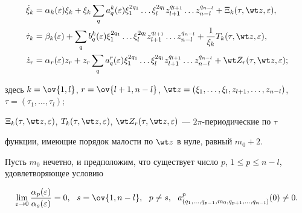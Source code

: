 \begin{align} 


\Dot\xi_k&=\alpha_k(\varepsilon)\xi_k+\xi_k\sum_q 


a^k_q(\varepsilon)\xi^{2q_1}_1\dotsc \xi^{2q_l}_l 


z^{q_{l+1}}_{l+1}\dotsc z^{q_{n-l}}_{n-l}+\Xi_k 


(\tau,\wt z,\varepsilon), \\ 


% 


\Dot\tau_k&=\beta_k(\varepsilon)+\sum_q b^k_q(\varepsilon) 


\xi^{2q_1}_1\dotsc \xi^{2q_l}_l z^{q_{l+1}}_{l+1}\dotsc 


z^{q_{n-l}}_{n-l}+\frac{1}{\xi_k}T_k 


(\tau,\wt z,\varepsilon), \\ 


% 


\Dot z_r&=\alpha_r(\varepsilon)z_r+z_r\sum_q a^r_q(\varepsilon) 


\xi^{2q_1}_1\dotsc \xi^{2q_l}_l z^{q_{l+1}}_{l+1}\dotsc 


z^{q_{n-l}}_{n-l}+\wt Z_r(\tau,\wt z,\varepsilon); 


\end{align} 


здесь $k=\ov{1,l}$, $r=\ov{l+1,n-l}$, $\wt z=(\xi_1,\dotsc,\xi_l, 


z_{l+1},\dotsc,z_{n-l})$, $\tau=(\tau_1,\dotsc,\tau_l)$; 


$\Xi_k(\tau,\wt z,\varepsilon)$, $T_k(\tau,\wt z,\varepsilon)$, $\wt 


Z_r(\tau,\wt z,\varepsilon)$ --- $2\pi$-периодические по $\tau$ 


функции, имеющие порядок малости по $\wt z$ в нуле, равный $m_0+2$. 


 


Пусть $m_0$ нечетно, и предположим, что существует число $p$, $1\le 


p\le n-l$, удовлетворяющее условию 


$$ 


\lim_{\varepsilon\to0}\frac{\alpha_p(\varepsilon)} 


{\alpha_s(\varepsilon)}=0,\ \ s=\ov{1,n-l}, 


\ \ p\ne s,\ \ a^p_{(q_1,\dotsc,q_{p-1},m_0, 


q_{p+1},\dotsc,q_{n-l})}(0)\ne0. 


$$ 


